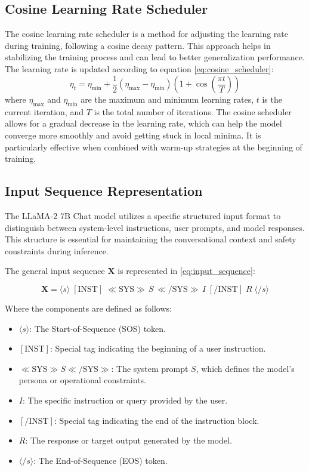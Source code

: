 \subsection{Cosine Learning Rate Scheduler}
The cosine learning rate scheduler is a method for adjusting the learning rate during training, following a cosine decay pattern. This approach helps in stabilizing the training process and can lead to better generalization performance. The learning rate is updated according to equation \eqref{eq:cosine_scheduler}:
\begin{equation}
    \label{eq:cosine_scheduler}
    \eta_t = \eta_{\min} + \frac{1}{2} (\eta_{\max} - \eta_{\min}) \left(1 + \cos\left(\frac{\pi t}{T}\right)\right)
\end{equation}
where $\eta_{\max}$ and $\eta_{\min}$ are the maximum and minimum learning rates, $t$ is the current iteration, and $T$ is the total number of iterations. The cosine scheduler allows for a gradual decrease in the learning rate, which can help the model converge more smoothly and avoid getting stuck in local minima. It is particularly effective when combined with warm-up strategies at the beginning of training.




\subsection{Input Sequence Representation}
The LLaMA-2 7B Chat model utilizes a specific structured input format to distinguish between system-level instructions, user prompts, and model responses. This structure is essential for maintaining the conversational context and safety constraints during inference. 

The general input sequence $\mathbf{X}$ is represented in \eqref{eq:input_sequence}:

\begin{equation}
    \label{eq:input_sequence}
\mathbf{X} = \langle s \rangle \; [\text{INST}] \; \ll \text{SYS} \gg \, S \, \ll / \text{SYS} \gg \, I \; [/\text{INST}] \; R \; \langle /s \rangle
\end{equation}

Where the components are defined as follows:
\begin{itemize}
    \item $\langle s \rangle$: The Start-of-Sequence (SOS) token.
    \item $[\text{INST}]$: Special tag indicating the beginning of a user instruction.
    \item $\ll \text{SYS} \gg S \ll / \text{SYS} \gg$: The system prompt $S$, which defines the model's persona or operational constraints.
    \item $I$: The specific instruction or query provided by the user.
    \item $[/\text{INST}]$: Special tag indicating the end of the instruction block.
    \item $R$: The response or target output generated by the model.
    \item $\langle /s \rangle$: The End-of-Sequence (EOS) token.
\end{itemize}

